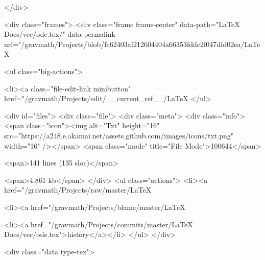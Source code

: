     </div>

    <div class="frames">
      <div class="frame frame-center" data-path="LaTeX Docs/vec/ode.tex/" data-permalink-url="/gravmath/Projects/blob/fc62403af212604404a66353fddc2f047dfd02ea/LaTeX%
        
          <ul class="big-actions">
            
            <li><a class="file-edit-link minibutton" href="/gravmath/Projects/edit/__current_ref__/LaTeX%
          </ul>
        

        <div id="files">
          <div class="file">
            <div class="meta">
              <div class="info">
                <span class="icon"><img alt="Txt" height="16" src="https://a248.e.akamai.net/assets.github.com/images/icons/txt.png" width="16" /></span>
                <span class="mode" title="File Mode">100644</span>
                
                  <span>141 lines (135 sloc)</span>
                
                <span>4.861 kb</span>
              </div>
              <ul class="actions">
                <li><a href="/gravmath/Projects/raw/master/LaTeX%
                
                  <li><a href="/gravmath/Projects/blame/master/LaTeX%
                
                <li><a href="/gravmath/Projects/commits/master/LaTeX Docs/vec/ode.tex">history</a></li>
              </ul>
            </div>
            
  <div class="data type-tex">
    
